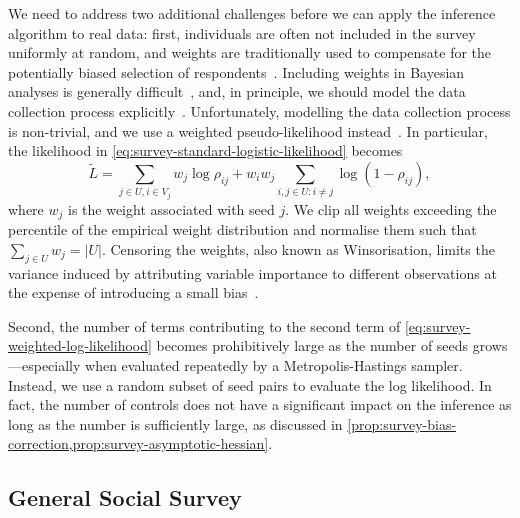 \documentclass{scrartcl}
\newcommand{\card}[1]{\left|#1\right|}
\newcommand{\seeds}{U}
\newcommand{\nominees}{V}
\begin{document}
We need to address two additional challenges before we can apply the inference algorithm to real data: first, individuals are often not included in the survey uniformly at random, and weights are traditionally used to compensate for the potentially biased selection of respondents~\cite{Kish1992}. Including weights in Bayesian analyses is generally difficult~\cite{Gelman2007}, and, in principle, we should model the data collection process explicitly~\cite[chapter~8]{Gelman2013}. Unfortunately, modelling the data collection process is non-trivial, and we use a weighted pseudo-likelihood instead~\cite{Pfeffermann1996}. In particular, the likelihood in \cref{eq:survey-standard-logistic-likelihood} becomes
\begin{equation}
    \tilde L = \sum_{j\in\seeds, i\in\nominees_j} w_j \log\rho_{ij} + w_i w_j \sum_{i, j\in\seeds:i\neq j} \log\left(1-\rho_{ij}\right),\label{eq:survey-weighted-log-likelihood}
\end{equation}
where $w_j$ is the weight associated with seed $j$. We clip all weights exceeding the  percentile of the empirical weight distribution and normalise them such that $\sum_{j\in\seeds}w_j=\card{\seeds}$. Censoring the weights, also known as Winsorisation, limits the variance induced by attributing variable importance to different observations at the expense of introducing a small bias~\cite{Kish1992}.

Second, the number of terms contributing to the second term of \cref{eq:survey-weighted-log-likelihood} becomes prohibitively large as the number of seeds grows---especially when evaluated repeatedly by a Metropolis-Hastings sampler. Instead, we use a random subset of seed pairs to evaluate the log likelihood. In fact, the number of controls does not have a significant impact on the inference as long as the number is sufficiently large, as discussed in \cref{prop:survey-bias-correction,prop:survey-asymptotic-hessian}.

\subsection{General Social Survey\label{sec:survey-gss}}
\end{document}
